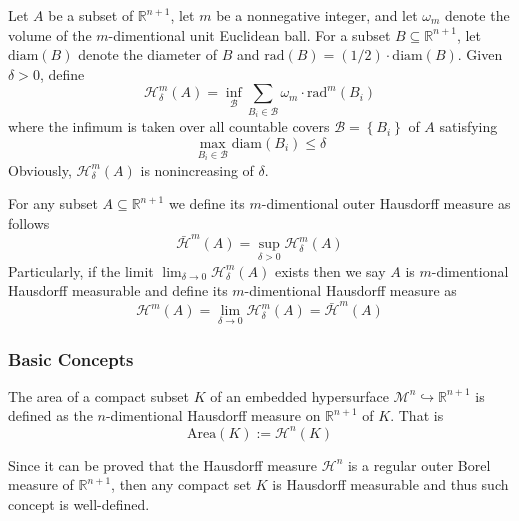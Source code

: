 Let $A$ be a subset of $\mathbb{R}^{n+1}$, let $m$ be a nonnegative integer, and let $\omega_m$ denote the volume of the $m$-dimentional unit Euclidean ball. For a subset $B\subseteq\mathbb{R}^{n+1}$, let $\mathrm{diam}(B)$ denote the diameter of $B$ and $\mathrm{rad}(B)=(1/2)\cdot\mathrm{diam}(B)$. Given $\delta>0$, define
\begin{equation*}
    \mathscr{H}^m_\delta (A)=\inf_{\mathcal{B}}\sum_{B_i\in\mathcal{B}}\omega_m\cdot{\mathrm{rad}}^m (B_i)
\end{equation*}
where the infimum is taken over all countable covers $\mathcal{B}=\left\{B_i\right\}$ of $A$ satisfying
\begin{equation*}
    \max_{B_i\in\mathcal{B}}\mathrm{diam}(B_i)\le\delta
\end{equation*}
Obviously, $\mathscr{H}^m_\delta (A)$ is nonincreasing of $\delta$.
\begin{definition}\label{def:Hausdorff Measure}
    For any subset $A\subseteq\mathbb{R}^{n+1}$ we define its $m$-dimentional outer Hausdorff measure as follows
    \begin{equation}
        \bar{\mathscr{H}}^m (A)=\sup_{\delta>0}\mathscr{H}^m_\delta (A)
    \end{equation}
    Particularly, if the limit $\lim_{\delta\to 0}\mathscr{H}^m_\delta (A)$ exists then we say $A$ is $m$-dimentional Hausdorff measurable and define its $m$-dimentional Hausdorff measure as
    \begin{equation*}
        \mathscr{H}^m (A)=\lim_{\delta\to 0}\mathscr{H}^m_\delta (A)=\bar{\mathscr{H}}^m (A)
    \end{equation*}
\end{definition}

\subsubsection{Basic Concepts}

\begin{definition}[Area]\label{def:Area}
    The area of a compact subset $K$ of an embedded hypersurface $\mathcal{M}^n\hookrightarrow \mathbb{R}^{n+1}$ is defined as the $n$-dimentional Hausdorff measure on $\mathbb{R}^{n+1}$ of $K$. That is
    \begin{equation}
        \mathrm{Area}(K):=\mathscr{H}^n (K)
    \end{equation}
\end{definition}

Since it can be proved that the Hausdorff measure $\mathscr{H}^n$ is a regular outer Borel measure of $\mathbb{R}^{n+1}$, then any compact set $K$ is Hausdorff measurable and thus such concept is well-defined.


